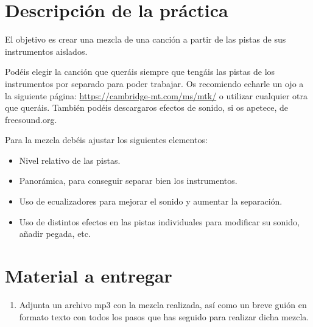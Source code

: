 \documentclass[es,practica]{uah}
\begin{document}

\maketitle




\section{Descripción de la práctica}

El objetivo es crear una mezcla de una canción a partir de las pistas de sus instrumentos aislados. 

Podéis elegir la canción que queráis siempre que tengáis las pistas de los instrumentos por separado para poder trabajar. Os recomiendo echarle un ojo a la siguiente página: \href{https://cambridge-mt.com/ms/mtk/}{https://cambridge-mt.com/ms/mtk/} o utilizar cualquier otra que queráis. También podéis descargaros efectos de sonido, si os apetece, de freesound.org.

Para la mezcla debéis ajustar los siguientes elementos:

\begin{itemize}
\item Nivel relativo de las pistas.
\item Panorámica, para conseguir separar bien los instrumentos.
\item Uso de ecualizadores para mejorar el sonido y aumentar la separación.
\item Uso de distintos efectos en las pistas individuales para modificar su sonido, añadir pegada, etc.
\end{itemize}

\section{Material a entregar}

\begin{enumerate}
\item Adjunta un archivo mp3 con la mezcla realizada, así como un breve guión en formato texto con todos los pasos que has seguido para realizar dicha mezcla.
\end{enumerate}
\end{document}
